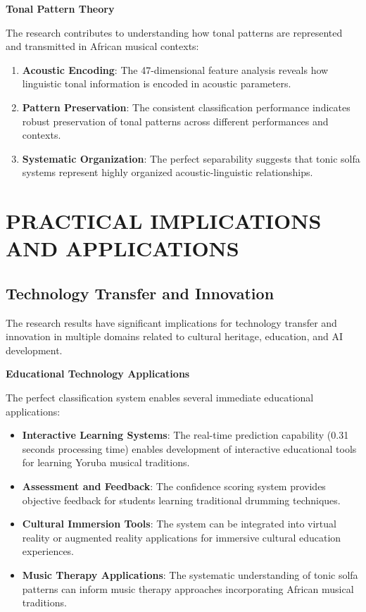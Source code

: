 \documentclass[12pt,a4paper]{article}
\begin{document}
\textbf{Tonal Pattern Theory}

The research contributes to understanding how tonal patterns are represented and transmitted in African musical contexts:

\begin{enumerate}
\item \textbf{Acoustic Encoding}: The 47-dimensional feature analysis reveals how linguistic tonal information is encoded in acoustic parameters.
\item \textbf{Pattern Preservation}: The consistent classification performance indicates robust preservation of tonal patterns across different performances and contexts.
\item \textbf{Systematic Organization}: The perfect separability suggests that tonic solfa systems represent highly organized acoustic-linguistic relationships.
\end{enumerate}

\section{PRACTICAL IMPLICATIONS AND APPLICATIONS}

\subsection{Technology Transfer and Innovation}

The research results have significant implications for technology transfer and innovation in multiple domains related to cultural heritage, education, and AI development.

\textbf{Educational Technology Applications}

The perfect classification system enables several immediate educational applications:

\begin{itemize}
\item \textbf{Interactive Learning Systems}: The real-time prediction capability (0.31 seconds processing time) enables development of interactive educational tools for learning Yoruba musical traditions.
\item \textbf{Assessment and Feedback}: The confidence scoring system provides objective feedback for students learning traditional drumming techniques.
\item \textbf{Cultural Immersion Tools}: The system can be integrated into virtual reality or augmented reality applications for immersive cultural education experiences.
\item \textbf{Music Therapy Applications}: The systematic understanding of tonic solfa patterns can inform music therapy approaches incorporating African musical traditions.
\end{itemize}
\end{document}
